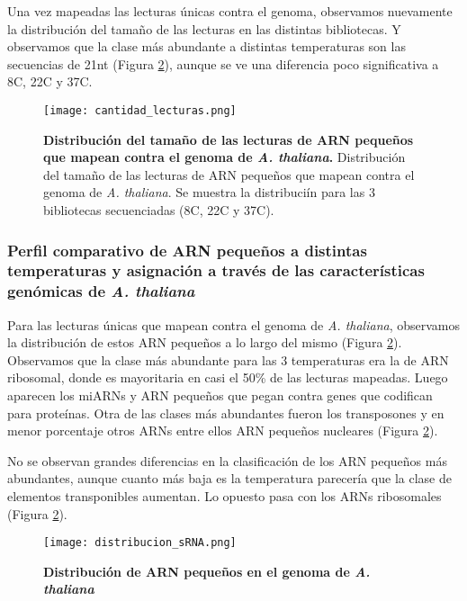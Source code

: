 Una vez mapeadas las lecturas únicas contra el genoma, observamos nuevamente la distribución del tamaño de las lecturas en las distintas bibliotecas.
Y observamos que la clase más abundante a distintas temperaturas son las secuencias de 21nt (Figura \ref{fig:distribucion_sRNA}), aunque se ve una diferencia poco significativa a 8\degree C, 22\degree C y 37\degree C.

\begin{figure}[htbp!] 
    \centering    
    \texttt{[image: cantidad\_lecturas.png]}
    \caption[Distribución del tamaño de las lecturas de ARN pequeños que mapean contra el genoma de \textit{A. thaliana}]{
    \textbf{Distribución del tamaño de las lecturas de ARN pequeños que mapean contra el genoma de \textit{A. thaliana}.}
    Distribución del tamaño de las lecturas de ARN pequeños que mapean contra el genoma de \textit{A. thaliana}.
    Se muestra la distribuciín para las 3 bibliotecas secuenciadas (8\degree C, 22\degree C y 37\degree C).
   }
     \label{fig:cantidad_lecturas}
\end{figure}


\subsubsection{Perfil comparativo de ARN pequeños a distintas temperaturas y asignación a través de las características genómicas de \textit{A. thaliana}}

Para las lecturas únicas que mapean contra el genoma de \textit{A. thaliana}, observamos la distribución de estos ARN pequeños a lo largo del mismo (Figura \ref{fig:distribucion_sRNA}).
Observamos que la clase más abundante para las 3 temperaturas era la de ARN ribosomal, donde es mayoritaria en casi el 50\% de las lecturas mapeadas.
Luego aparecen los miARNs y ARN pequeños que pegan contra genes que codifican para proteínas.
Otra de las clases más abundantes fueron los transposones y en menor porcentaje otros ARNs entre ellos ARN pequeños nucleares (Figura \ref{fig:distribucion_sRNA}).

No se observan grandes diferencias en la clasificación de los ARN pequeños más abundantes, aunque cuanto más baja es la temperatura parecería que la clase de elementos transponibles aumentan.
Lo opuesto pasa con los ARNs ribosomales (Figura \ref{fig:distribucion_sRNA}).

\begin{figure}[htbp!] 
    \centering    
    \texttt{[image: distribucion\_sRNA.png]}
    \caption[Distribución de ARN pequeños en el genoma de \textit{A. thaliana}]{
    \textbf{Distribución de ARN pequeños en el genoma de \textit{A. thaliana}}
        }
     \label{fig:distribucion_sRNA}
\end{figure}

